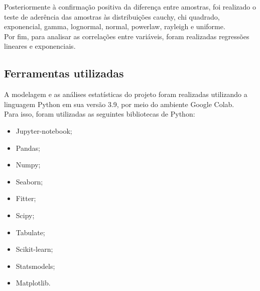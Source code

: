 Posteriormente à confirmação positiva da diferença entre amostras, foi realizado o teste de aderência das amostras às distribuições cauchy, chi quadrado, exponencial, gamma, lognormal, normal, powerlaw, rayleigh e uniforme.\\
Por fim, para analisar as correlações entre variáveis, foram realizadas regressões lineares e exponenciais.\\

\subsection{Ferramentas utilizadas}
A modelagem e as análises estatísticas do projeto foram realizadas utilizando a linguagem Python em sua versão 3.9, por meio do ambiente Google Colab.\\
Para isso, foram utilizadas as seguintes bibliotecas de Python:

\begin{itemize}
    \item Jupyter-notebook;
    \item Pandas;
    \item Numpy;
    \item Seaborn;
    \item Fitter;
    \item Scipy;
    \item Tabulate;
    \item Scikit-learn;
    \item Statsmodels;
    \item Matplotlib.
\end{itemize}